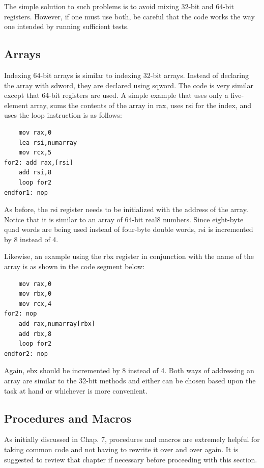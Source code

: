 \documentclass[10pt]{book}
\begin{document}
The simple solution to such problems is to avoid mixing 32-bit and 64-bit registers. However, if one must use both, be careful that the code works the way one intended by running sufficient tests.

\subsection{Arrays}
Indexing 64-bit arrays is similar to indexing 32-bit arrays. Instead of declaring the array with sdword, they are declared using sqword. The code is very similar except that 64-bit registers are used. A simple example that uses only a five-element array, sums the contents of the array in rax, uses rsi for the index, and uses the loop instruction is as follows:
\begin{verbatim}
    mov rax,0
    lea rsi,numarray
    mov rcx,5
for2: add rax,[rsi]
    add rsi,8
    loop for2
endfor1: nop
\end{verbatim}

As before, the rsi register needs to be initialized with the address of the array. Notice that it is similar to an array of 64-bit real8 numbers. Since eight-byte quad words are being used instead of four-byte double words, rsi is incremented by 8 instead of 4.

Likewise, an example using the rbx register in conjunction with the name of the array is as shown in the code segment below:

\begin{verbatim}
    mov rax,0
    mov rbx,0
    mov rcx,4
for2: nop
    add rax,numarray[rbx]
    add rbx,8
    loop for2
endfor2: nop
\end{verbatim}

Again, ebx should be incremented by 8 instead of 4. Both ways of addressing an array are similar to the 32-bit methods and either can be chosen based upon the task at hand or whichever is more convenient.

\subsection{Procedures and Macros}
As initially discussed in Chap. 7, procedures and macros are extremely helpful for taking common code and not having to rewrite it over and over again. It is suggested to review that chapter if necessary before proceeding with this section.
\end{document}

